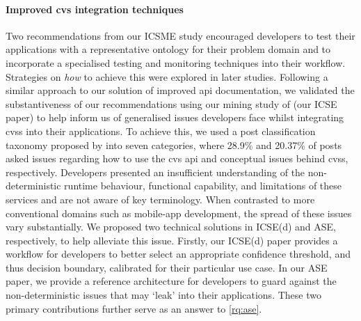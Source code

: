 \paragraph{Improved \gls{cvs} integration techniques} Two recommendations from our ICSME study encouraged developers to test their applications with a representative ontology for their problem domain and to incorporate a specialised testing and monitoring techniques into their workflow. Strategies on \textit{how} to achieve this were explored in later studies.  Following a similar approach to our solution of improved \gls{api} documentation, we validated the substantiveness of our recommendations using our mining study of  (our ICSE paper) to help inform us of generalised issues developers face whilst integrating \glspl{cvs} into their applications. To achieve this, we used a  post classification taxonomy proposed by \citet{Beyer:2018fm} into seven categories, where 28.9\% and 20.37\% of posts asked issues regarding how to use the \gls{cvs} \gls{api} and conceptual issues behind \glspl{cvs}, respectively. Developers presented an insufficient understanding of the non-deterministic runtime behaviour, functional capability, and limitations of these services and are not aware of key  terminology. When contrasted to more conventional domains such as mobile-app development, the spread of these issues vary substantially. We proposed two technical solutions in ICSE(d) and ASE, respectively, to help alleviate this issue.  Firstly, our ICSE(d) paper provides a workflow for developers to better select an appropriate confidence threshold, and thus decision boundary, calibrated for their particular use case. In our ASE paper, we provide a reference architecture for developers to guard against the non-deterministic issues that may `leak' into their applications. These two primary contributions further serve as an answer to \ref{rq:ase}.


